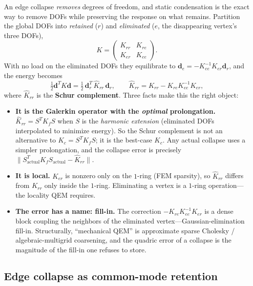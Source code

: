An edge collapse \emph{removes} degrees of freedom, and static condensation is the exact way to remove DOFs while preserving the response on what remains.
Partition the global DOFs into \emph{retained} ($r$) and \emph{eliminated} ($e$, the disappearing vertex's three DOFs),
\begin{equation}
  K = \begin{pmatrix} K_{rr} & K_{re} \\ K_{er} & K_{ee} \end{pmatrix}.
\end{equation}
With no load on the eliminated DOFs they equilibrate to $\mathbf{d}_e = -K_{ee}^{-1}K_{er}\mathbf{d}_r$, and the energy becomes
\begin{equation}
  \tfrac12\mathbf{d}^T K\mathbf{d}
    = \tfrac12\,\mathbf{d}_r^T\,\widehat{K}_{rr}\,\mathbf{d}_r,
  \qquad
  \widehat{K}_{rr} = K_{rr} - K_{re}K_{ee}^{-1}K_{er},
\end{equation}
where $\widehat{K}_{rr}$ is the \textbf{Schur complement}.
Three facts make this the right object:
\begin{itemize}
  \item \textbf{It is the Galerkin operator with the \emph{optimal} prolongation.}
        $\widehat{K}_{rr} = S^T K_f S$ when $S$ is the \emph{harmonic extension} (eliminated DOFs interpolated to minimize energy).
        So the Schur complement is not an alternative to $K_c = S^T K_f S$; it is the best-case $K_c$.
        Any actual collapse uses a simpler prolongation, and the collapse error is precisely $\|S_{\text{actual}}^T K_f S_{\text{actual}} - \widehat{K}_{rr}\|$.
  \item \textbf{It is local.}
        $K_{er}$ is nonzero only on the $1$-ring (FEM sparsity), so $\widehat{K}_{rr}$ differs from $K_{rr}$ only inside the $1$-ring.
        Eliminating a vertex is a $1$-ring operation---the locality QEM requires.
  \item \textbf{The error has a name: fill-in.}
        The correction $-K_{re}K_{ee}^{-1}K_{er}$ is a dense block coupling the neighbors of the eliminated vertex---Gaussian-elimination fill-in.
        Structurally, ``mechanical QEM'' is approximate sparse Cholesky / algebraic-multigrid coarsening, and the quadric error of a collapse is the magnitude of the fill-in one refuses to store.
\end{itemize}

\subsection{Edge collapse as common-mode retention}

